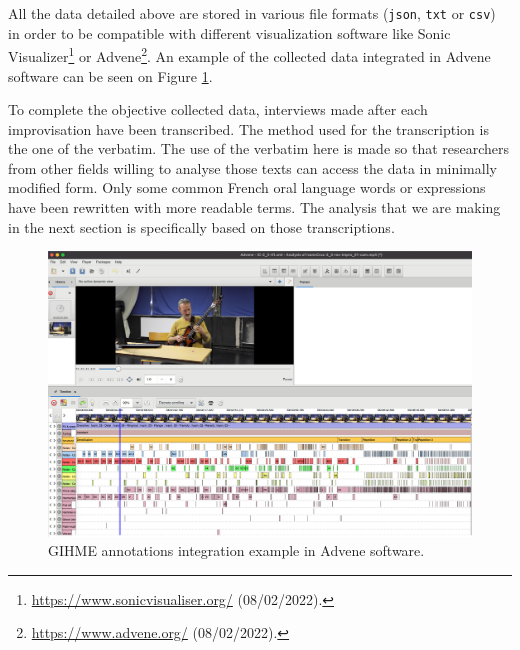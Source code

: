 \documentclass{article}
\begin{document}

All the data detailed above are stored in various file formats (\texttt{json}, \texttt{txt} or \texttt{csv}) in order to be compatible with different visualization software like Sonic Visualizer\footnote{\url{https://www.sonicvisualiser.org/} (08/02/2022).} or Advene\footnote{\url{https://www.advene.org/} (08/02/2022).}. An example of the collected data integrated in Advene software can be seen on Figure \ref{fig:Ivann-2_4-advene}. %

To complete the objective collected data, interviews made after each improvisation have been transcribed.  The me\-thod used for the transcription is the one of the verbatim. The use of the verbatim here is made so that researchers from other fields willing to analyse those texts can access the data in minimally modified form. Only some common French oral language words or expressions have been rewritten with more readable terms. The analysis that we are making in the next section is specifically based on those transcriptions. 




\begin{figure}
    \centering
    \includegraphics[width=\columnwidth]{figures/IvannCruz_2_3_1_Advene.png}
    \caption{GIHME annotations integration example in Advene software.}
    \label{fig:Ivann-2_4-advene}
\end{figure}
\end{document}
